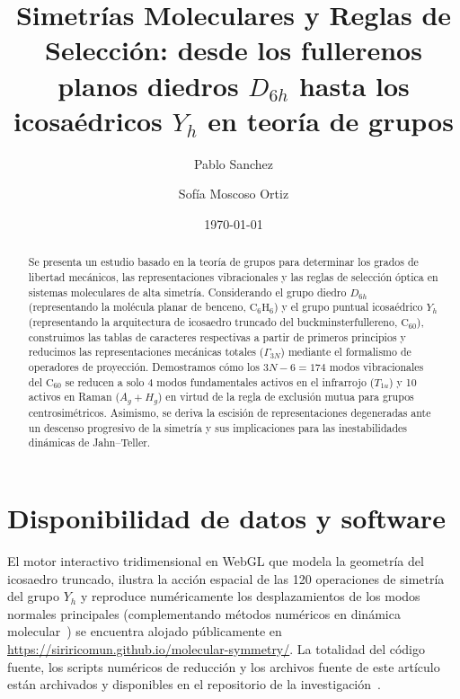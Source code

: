 \documentclass[aps,prl,reprint,twocolumn,superscriptaddress,amsmath,amssymb,floatfix,nobalancelastpage]{revtex4-2}
\begin{document}
\title{Simetrías Moleculares y Reglas de Selección: desde los fullerenos planos diedros $D_{6h}$ hasta los icosaédricos $Y_h$ en teoría de grupos}

\author{Pablo Sanchez}

\author{Sofía Moscoso Ortiz}

\date{\today}

\begin{abstract}
Se presenta un estudio basado en la teoría de grupos para determinar los grados de libertad mecánicos, las representaciones vibracionales y las reglas de selección óptica en sistemas moleculares de alta simetría. Considerando el grupo diedro $D_{6h}$ (representando la molécula planar de benceno, $\text{C}_6\text{H}_6$) y el grupo puntual icosaédrico $Y_h$ (representando la arquitectura de icosaedro truncado del buckminsterfullereno, $\text{C}_{60}$), construimos las tablas de caracteres respectivas a partir de primeros principios y reducimos las representaciones mecánicas totales ($\Gamma_{3N}$) mediante el formalismo de operadores de proyección. Demostramos cómo los $3N-6=174$ modos vibracionales del $\text{C}_{60}$ se reducen a solo 4 modos fundamentales activos en el infrarrojo ($T_{1u}$) y 10 activos en Raman ($A_g + H_g$) en virtud de la regla de exclusión mutua para grupos centrosimétricos. Asimismo, se deriva la escisión de representaciones degeneradas ante un descenso progresivo de la simetría y sus implicaciones para las inestabilidades dinámicas de Jahn--Teller.
\end{abstract}

\maketitle








\section*{Disponibilidad de datos y software}
El motor interactivo tridimensional en WebGL que modela la geometría del icosaedro truncado, ilustra la acción espacial de las 120 operaciones de simetría del grupo $Y_h$ y reproduce numéricamente los desplazamientos de los modos normales principales (complementando métodos numéricos en dinámica molecular~\cite{Heredia2004}) se encuentra alojado públicamente en \url{https://siriricomun.github.io/molecular-symmetry/}. La totalidad del código fuente, los scripts numéricos de reducción y los archivos fuente de este artículo están archivados y disponibles en el repositorio de la investigación~\cite{RepositorySource}.


\end{document}

